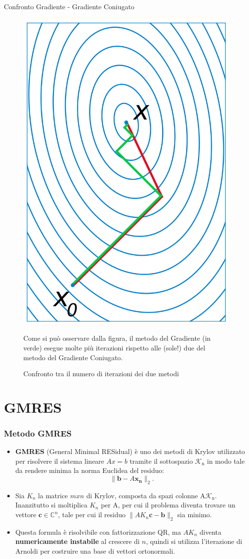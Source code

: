 \documentclass[10pt]{beamer}
\begin{document}
\begin{frame}{Confronto Gradiente - Gradiente Coniugato}
    \begin{figure}
    \centering
    \includegraphics[width=.35\linewidth]{cg_comp.png}
    \caption{Confronto tra il numero di iterazioni dei due metodi}
Come si può osservare dalla figura, il metodo del Gradiente (in verde) esegue molte più iterazioni rispetto alle (sole!) due del metodo del Gradiente Coniugato. 
\end{figure}
\end{frame}

\section{GMRES}\label{sec:sec3}

\begin{frame} \frametitle{Metodo GMRES}
\begin{itemize}
    \item \textbf{GMRES} (General Minimal RESidual) è uno dei metodi di Krylov utilizzato per risolvere il sistema lineare $Ax = b$ tramite il sottospazio
    $\mathcal{K}_\mathrm{n}$ in modo tale da rendere minima la norma Euclidea del residuo: $$\|\mathbf{b}-A\mathbf{x_n}\|_2.$$
    
    \item Sia $K_n$ la matrice $m x n$ di Krylov, composta da spazi colonne A$\mathcal{K}_\mathrm{n}$. Inanzitutto si moltiplica $K_n$ per A, per cui il problema diventa trovare un vettore $\mathbf{c}\in\mathbb{C}^n$, tale per cui il residuo $\|AK_n\mathbf{c}-\mathbf{b}\|_2$ sia minimo. 
    
    \item Questa formula è risolvibile con fattorizzazione QR, ma $AK_n$ diventa \textbf{numericamente instabile} al crescere di $n$, quindi si utilizza \alert{l'iterazione di Arnoldi} per costruire una base di vettori ortonormali.

\end{itemize}
\end{frame}
\end{document}
